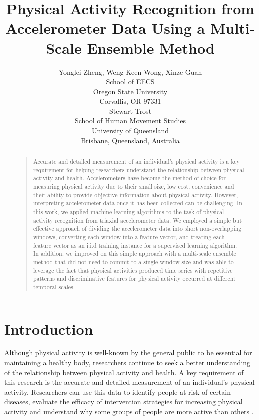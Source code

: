 \documentclass[letterpaper]{article}
\begin{document}
%
\title{Physical Activity Recognition from Accelerometer Data Using a Multi-Scale Ensemble Method}
\author{Yonglei Zheng, Weng-Keen Wong, Xinze Guan \\ School of EECS \\ Oregon State University \\ Corvallis, OR 97331 \\
\And
Stewart Trost \\ School of Human Movement Studies \\ University of Queensland \\Brisbane, Queensland, Australia
}
\maketitle
\begin{abstract}
\begin{quote}
Accurate and detailed measurement of an individual's physical activity is a key requirement for helping researchers understand the relationship between physical activity and health. Accelerometers have become the method of choice for measuring physical activity due to their small size, low cost, convenience and their ability to provide objective information about physical activity. However, interpreting accelerometer data once it has been collected can be challenging. In this work, we applied machine learning algorithms to the task of physical activity recognition from triaxial accelerometer data. We employed a simple but effective approach of dividing the accelerometer data into short non-overlapping windows, converting each window into a feature vector, and treating each feature vector as an i.i.d training instance for a supervised learning algorithm. In addition, we improved on this simple approach with a multi-scale ensemble method that did not need to commit to a single window size and was able to leverage the fact that physical activities produced time series with repetitive patterns and discriminative features for physical activity occurred at different temporal scales.  
\end{quote}
\end{abstract}

\section{Introduction}
Although physical activity is well-known by the general public to be essential for maintaining a healthy body, researchers continue to seek a better understanding of the relationship between physical activity and health. A key requirement of this research is the accurate and detailed measurement of an individual's physical activity. Researchers can use this data to identify people at risk of certain diseases, evaluate the efficacy of intervention strategies for increasing physical activity and understand why some groups of people are more active than others \cite{BPSO:06}.
\end{document}
